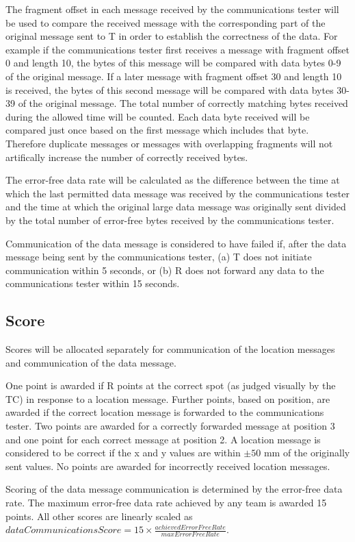 \documentclass[12pt]{article}
\begin{document}
The fragment offset in each message received by the communications tester will be used to compare the received message with the corresponding part of the original message sent to T in order to establish the correctness of the data. For example if the communications tester first receives a message with fragment offset 0 and length 10, the bytes of this message will be compared with data bytes 0-9 of the original message. If a later message with fragment offset 30 and length 10 is received, the bytes of this second message will be compared with data bytes 30-39 of the original message. The total number of correctly matching bytes received during the allowed time
will be counted. Each data byte received will be compared just once based on the first message which includes that byte. Therefore duplicate messages or messages with overlapping fragments will not artifically increase the number of correctly received bytes.

The error-free data rate will be calculated as the difference between the time at which the last permitted data message was received by the communications tester and the time at which the original large data message was originally sent divided by the total number of error-free bytes received by the communications tester.

Communication of the data message is considered to have failed if, after the data message being sent by the communications tester, (a) T does not initiate communication within 5 seconds, or (b) R does not forward any data to the communications tester within 15 seconds.

\subsection{Score}
Scores will be allocated separately for communication of the location messages and communication of the data message.

One point is awarded if R points at the correct spot (as judged visually by the TC) in response to a location message. Further points, based on position, are awarded if the correct location message is forwarded to the communications tester. Two points are awarded for a correctly forwarded message at position 3 and one point for each correct message at position 2. A location message is considered to be correct if the x and y values are within $\pm50$ mm of the originally sent values. No points are awarded for incorrectly received location messages.

Scoring of the data message communication is determined by the error-free data rate. The maximum error-free data rate achieved by any team is awarded 15 points. All other scores are linearly scaled as $dataCommunicationsScore = 15 \times \frac{achievedErrorFreeRate}{maxErrorFreeRate}$. 
\end{document}
